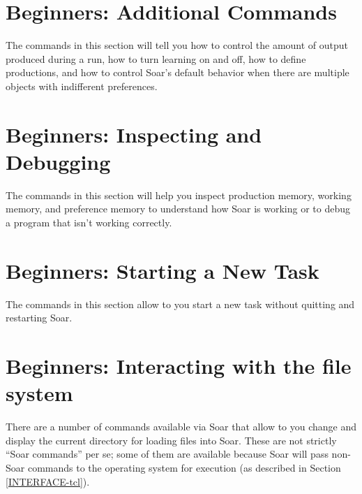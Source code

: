 {%
\section{Beginners: Additional Commands}

The commands in this section will tell you how to control the amount of output
produced during a run, how to turn learning on and off, how to define
productions, and how to control Soar's default behavior when there are
multiple objects with indifferent preferences.


\section{Beginners: Inspecting and Debugging}
\label{INTERFACE-beg-inspect}

The commands in this section will help you inspect production memory, working
memory, and preference memory to understand how Soar is working or to debug a
program that isn't working correctly.

\section{Beginners: Starting a New Task}

The commands in this section allow to you start a new task without quitting
and restarting Soar.

\section{Beginners: Interacting with the file system}

There are a number of commands available via Soar that allow to you change and
display the current directory for loading files into Soar. These are not
strictly ``Soar commands'' per se; some of them are available because Soar
will pass non-Soar commands to the operating system for execution (as
described in Section \ref{INTERFACE-tcl}).

}
